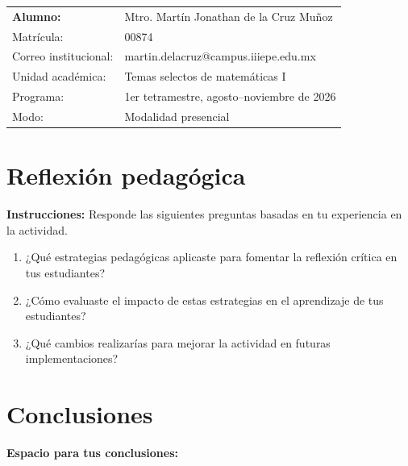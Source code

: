 \documentclass[spanish,letterpaper,oneside]{article}
\makeatletter
\def\coursename{Temas selectos de matemáticas I}
\def\studentfullname{Mtro. Martín Jonathan de la Cruz Muñoz}
\def\studentid{00874}
\def\studentemail{martin.delacruz@campus.iiiepe.edu.mx}
\def\programperiod{1er tetramestre, agosto--noviembre de 2026}
\def\programmodality{Modalidad presencial}
\def\authortable{
  \begin{tabular}{ll}
    \textbf{Alumno:} & \studentfullname \\
    Matrícula: & \studentid \\
    Correo institucional: & \studentemail \\
    Unidad académica: & \coursename \\
    Programa: & \programperiod \\
    Modo: & \programmodality \\
  
  \end{tabular}
}
\makeatother
\begin{document}
\authortable
\section*{Reflexión pedagógica}
\noindent\textbf{Instrucciones:} Responde las siguientes preguntas basadas en tu experiencia en la actividad.
\begin{enumerate}
  \item ¿Qué estrategias pedagógicas aplicaste para fomentar la reflexión crítica en tus estudiantes?
  \item ¿Cómo evaluaste el impacto de estas estrategias en el aprendizaje de tus estudiantes?
  \item ¿Qué cambios realizarías para mejorar la actividad en futuras implementaciones?
\end{enumerate}
\section*{Conclusiones}
\noindent\textbf{Espacio para tus conclusiones:}
\end{document}
